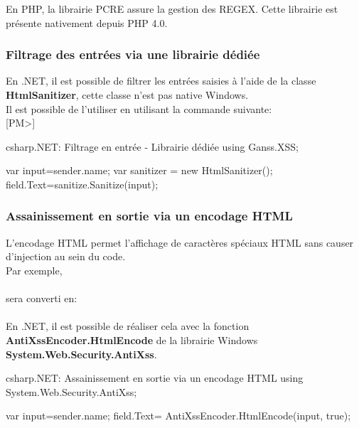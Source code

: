 En PHP, la librairie PCRE assure la gestion des \gls{REGEX}. Cette librairie est présente nativement depuis PHP 4.0.

\subsubsection{Filtrage des entrées via une librairie dédiée}
En .NET, il est possible de filtrer les entrées saisies à l'aide de la classe \textbf{HtmlSanitizer}, cette classe n'est pas native Windows.\\
Il est possible de l'utiliser en utilisant la commande  suivante:\\
[PM>]
\begin{Config}{csharp}{.NET: Filtrage en entrée - Librairie dédiée}
using Ganss.XSS;

	var input=sender.name;
	var sanitizer = new HtmlSanitizer();
	field.Text=sanitize.Sanitize(input);
\end{Config}	

\subsubsection{Assainissement en sortie via un encodage HTML}
L'encodage HTML permet l'affichage de caractères spéciaux HTML sans causer d'injection au sein du code.\\
Par exemple, \\
\indent {}\\
sera converti en:\\
\indent {}\\

En .NET, il est possible de réaliser cela avec la fonction \textbf{AntiXssEncoder.HtmlEncode} de la librairie Windows \textbf{System.Web.Security.AntiXss}.
\begin{Config}{csharp}{.NET: Assainissement en sortie via un encodage HTML}
using System.Web.Security.AntiXss;

	var input=sender.name;
	field.Text= AntiXssEncoder.HtmlEncode(input, true);

\end{Config}	

